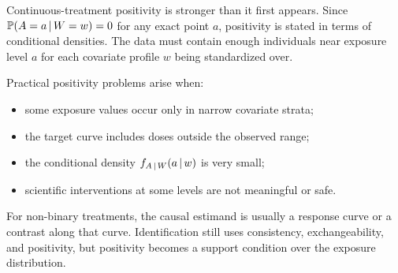 Continuous-treatment positivity is stronger than it first appears. Since
$\mathbb{P}(A=a\,\vert\, W=w)=0$ for any exact point $a$, positivity is stated in terms
of conditional densities. The data must contain enough individuals near exposure
level $a$ for each covariate profile $w$ being standardized over.

Practical positivity problems arise when:
\begin{itemize}
  \item some exposure values occur only in narrow covariate strata;
  \item the target curve includes doses outside the observed range;
  \item the conditional density $f_{A\,\vert\, W}(a\,\vert\, w)$ is very small;
  \item scientific interventions at some levels are not meaningful or safe.
\end{itemize}

\begin{keyidea}
For non-binary treatments, the causal estimand is usually a response curve or a
contrast along that curve. Identification still uses consistency,
exchangeability, and positivity, but positivity becomes a support condition over
the exposure distribution.
\end{keyidea}
